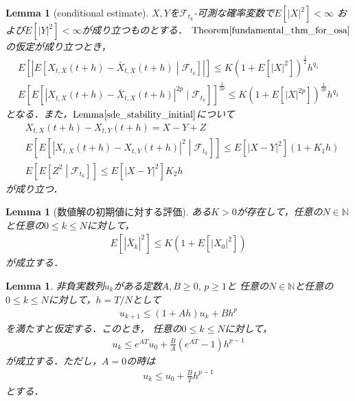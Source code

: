 \documentclass[dvipdfmx,autodetect-engine]{jsarticle}
\newtheorem{lemma}[theorem]{Lemma}
\theoremstyle{remark}
\theoremstyle{definition}
\newcommand{\N}{\mathbb{N}}
\newcommand{\abs}[1]{\left\lvert#1\right\rvert}
\newcommand{\setmid}{\mathrel{} \middle| \mathrel{}}
\begin{document}
\begin{lemma}[conditional estimate]
    $X,Y$を$\mathcal{F}_{t_{k}}$-可測な確率変数で$E[\abs{X}^{2}]<\infty$
    および$E[\abs{Y}^{2}]<\infty$が成り立つものとする．
    $\mathrm{Theorem}\ref{fundamental_thm_for_osa}$の仮定が成り立つとき，
    \begin{align}
        E\left[ \abs{ 
            E [ 
                X_{t,X}(t+h) - \bar{X}_{t,X}(t+h) \setmid \mathcal{F}_{t_{k}} 
            ] 
            } 
        \right]
        \leq K(
            1+E[
            \abs{X}^{2}
            ]
            )^{\frac{1}{2}} h^{q_{1}} \\
        E\left[ 
            E[
                \abs{ X_{t,X}(t+h)- \bar{X}_{t,X}(t+h) }^{2p}
            \mid \mathcal{F}_{t_{k}}
        ]
        \right]^{\frac{1}{2p}}
        \leq K(1+E[\abs{X}^{2p}])^{\frac{1}{2p}} h^{q_{2}}
    \end{align}
    となる．また，$\mathrm{Lemma}\ref{sde_stability_initial}$について
    \begin{align}
        &X_{t,X}(t+h) - X_{t,Y}(t+h) = X-Y + Z \\
        &E\left[
            E[
                \abs{
                    X_{t,X}(t+h) - X_{t,Y}(t+h) 
                }^{2}
                \setmid \mathcal{F}_{t_{k}}
            ]
        \right]
        \leq
        E[
            \abs{X-Y}^{2}
        ]
        (1+K_{1}h) \\
        &E\left[
            E[
                Z^{2} \setmid \mathcal{F}_{t_{k}}
            ]
        \right]
        \leq
        E[
            \abs{X-Y}^{2}
        ] K_{2}h
    \end{align}
    が成り立つ．
\end{lemma}


\begin{lemma}[数値解の初期値に対する評価]
    ある$K>0$が存在して，任意の$N \in \N$と任意の$0\leq k\leq N$に対して，
    \begin{align}
        E[\abs{\bar{X}_{k}}^{2}] \leq K(1+E[\abs{X_{0}}^{2}])
    \end{align}
    が成立する．
\end{lemma}


\begin{lemma}
    非負実数列$u_{k}$がある定数$A,B\geq 0,\,p\geq 1$と
    任意の$N \in \N$と任意の$0\leq k\leq N$に対して，$h = T/N$として
    \begin{align}
        u_{k+1} \leq (1+Ah)u_{k} + Bh^{p}
    \end{align}
    を満たすと仮定する．このとき，
    任意の$0\leq k\leq N$に対して，
    \begin{align}
        u_{k} \leq e^{AT}u_{0} + \frac{B}{A}(e^{AT}-1)h^{p-1}
    \end{align}
    が成立する．ただし，$A=0$の時は
    \begin{align}
        u_{k} \leq u_{0} + \frac{B}Th^{p-1}
    \end{align}
    とする．
\end{lemma}
\end{document}
